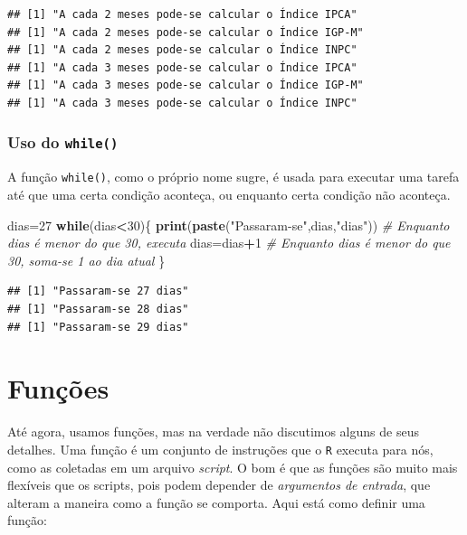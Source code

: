 \documentclass[
]{book}
\newenvironment{Shaded}{\begin{snugshade}}{\end{snugshade}}
\newcommand{\CommentTok}[1]{\textcolor[rgb]{0.56,0.35,0.01}{\textit{#1}}}
\newcommand{\ControlFlowTok}[1]{\textcolor[rgb]{0.13,0.29,0.53}{\textbf{#1}}}
\newcommand{\DecValTok}[1]{\textcolor[rgb]{0.00,0.00,0.81}{#1}}
\newcommand{\KeywordTok}[1]{\textcolor[rgb]{0.13,0.29,0.53}{\textbf{#1}}}
\newcommand{\NormalTok}[1]{#1}
\newcommand{\OperatorTok}[1]{\textcolor[rgb]{0.81,0.36,0.00}{\textbf{#1}}}
\newcommand{\StringTok}[1]{\textcolor[rgb]{0.31,0.60,0.02}{#1}}
\theoremstyle{definition}
\theoremstyle{definition}
\theoremstyle{definition}
\theoremstyle{remark}
\begin{document}
\begin{verbatim}
## [1] "A cada 2 meses pode-se calcular o Índice IPCA"
## [1] "A cada 2 meses pode-se calcular o Índice IGP-M"
## [1] "A cada 2 meses pode-se calcular o Índice INPC"
## [1] "A cada 3 meses pode-se calcular o Índice IPCA"
## [1] "A cada 3 meses pode-se calcular o Índice IGP-M"
## [1] "A cada 3 meses pode-se calcular o Índice INPC"
\end{verbatim}

\hypertarget{uso-do-while}{%
\subsubsection{\texorpdfstring{Uso do \texttt{while()}}{Uso do while()}}\label{uso-do-while}}

A função \texttt{while()}, como o próprio nome sugre, é usada para executar uma tarefa até que uma certa condição aconteça, ou enquanto certa condição não aconteça.

\begin{Shaded}
\begin{Highlighting}[]
\NormalTok{dias=}\DecValTok{27}
\ControlFlowTok{while}\NormalTok{(dias}\OperatorTok{<}\DecValTok{30}\NormalTok{)\{}
  \KeywordTok{print}\NormalTok{(}\KeywordTok{paste}\NormalTok{(}\StringTok{"Passaram-se"}\NormalTok{,dias,}\StringTok{"dias"}\NormalTok{)) }\CommentTok{# Enquanto dias é menor do que 30, executa}
\NormalTok{  dias=dias}\OperatorTok{+}\DecValTok{1} \CommentTok{# Enquanto dias é menor do que 30, soma-se 1 ao dia atual}
\NormalTok{\}}
\end{Highlighting}
\end{Shaded}

\begin{verbatim}
## [1] "Passaram-se 27 dias"
## [1] "Passaram-se 28 dias"
## [1] "Passaram-se 29 dias"
\end{verbatim}

\hypertarget{funuxe7uxf5es}{%
\section{Funções}\label{funuxe7uxf5es}}

Até agora, usamos funções, mas na verdade não discutimos alguns de seus detalhes. Uma função é um conjunto de instruções que o \texttt{R} executa para nós, como as coletadas em um arquivo \emph{script}. O bom é que as funções são muito mais flexíveis que os scripts, pois podem depender de \emph{argumentos de entrada}, que alteram a maneira como a função se comporta. Aqui está como definir uma função:
\end{document}
